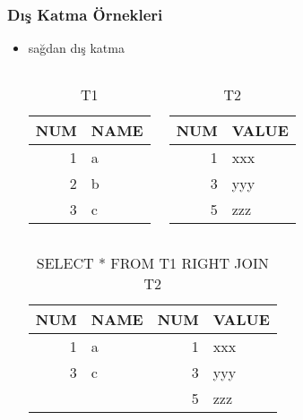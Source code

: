 \documentclass[dvipsnames]{beamer}
\theoremstyle{plain}
\begin{document}
\begin{frame}[fragile]
  \frametitle{Dış Katma Örnekleri}

  \begin{itemize}
    \item sağdan dış katma
    \begin{columns}[t]
      \begin{tiny}
      \begin{table}
        \caption{T1}
        \begin{tabular}{|r|l|}\hline
NUM & NAME\\\hline\hline
  1 & a   \\\hline
  2 & b   \\\hline
  3 & c   \\\hline
        \end{tabular}
      \end{table}
      \end{tiny}

      \begin{tiny}
      \begin{table}
        \caption{T2}
        \begin{tabular}{|r|l|}\hline
NUM & VALUE\\\hline\hline
  1 & xxx  \\\hline
  3 & yyy  \\\hline
  5 & zzz  \\\hline
        \end{tabular}
      \end{table}
      \end{tiny}
    \end{columns}

    \pause
    \begin{center}
      \begin{tiny}
      \begin{table}
        \caption{SELECT * FROM T1 RIGHT JOIN T2}
        \begin{tabular}{|r|l|r|l|}\hline
NUM & NAME & NUM & VALUE\\\hline\hline
  1 & a    &   1 & xxx  \\\hline
  3 & c    &   3 & yyy  \\\hline
    &      &   5 & zzz  \\\hline
        \end{tabular}
      \end{table}
      \end{tiny}
    \end{center}
  \end{itemize}
\end{frame}
\end{document}
